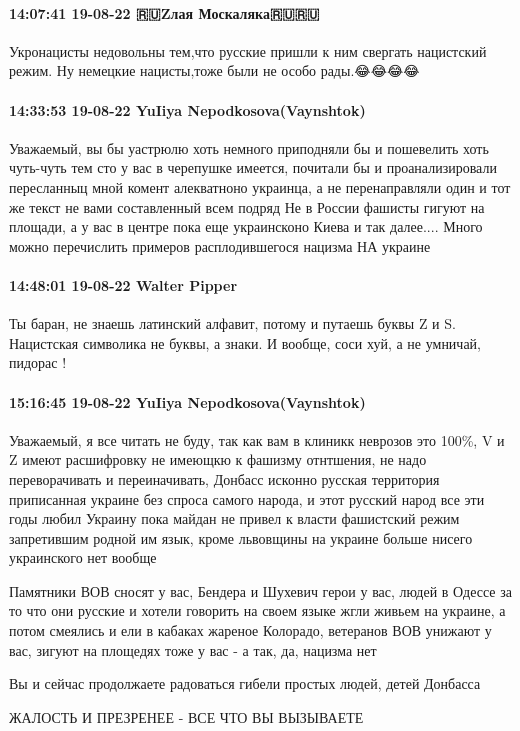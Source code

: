 \paragraph{14:07:41 19-08-22 🇷🇺Zлая Москаляка🇷🇺🇷🇺}

Укронацисты недовольны тем,что русские пришли к ним свергать нацистский режим.
Ну немецкие нацисты,тоже были не особо рады.😂😂😂😂

\paragraph{14:33:53 19-08-22 YuIiya Nepodkosova(Vaynshtok)}

Уважаемый, вы бы уастрюлю хоть немного приподняли бы и пошевелить хоть чуть-чуть тем сто у вас в черепушке имеется, почитали бы и проанализировали пересланныц мной комент алекватноно украинца, а не перенаправляли один и тот же текст не вами составленный всем подряд
Не в России фашисты гигуют на площади, а у вас в центре пока еще украинсконо Киева и так далее.... Много можно перечислить примеров расплодившегося нацизма НА украине

\paragraph{14:48:01 19-08-22 Walter Pipper}

Ты баран, не знаешь латинский алфавит, потому и путаешь буквы Z и S. Нацистская
символика не буквы, а знаки. И вообще, соси хуй, а не умничай, пидорас !

\paragraph{15:16:45 19-08-22 YuIiya Nepodkosova(Vaynshtok)}

Уважаемый, я все читать не буду, так как вам в клиникк неврозов это 100\%, V и Z
имеют расшифровку не имеющкю к фашизму отнтшения, не надо переворачивать и
переиначивать, Донбасс исконно русская территория приписанная украине без
спроса самого народа, и этот русский народ все эти годы любил Украину пока
майдан не привел к власти фашистский режим запретившим родной им язык, кроме
львовщины на украине больше нисего украинского нет вообще

Памятники ВОВ сносят у вас, Бендера и Шухевич герои у вас, людей в Одессе за то
что они русские и хотели говорить на своем языке жгли живьем на украине, а
потом смеялись и ели в кабаках жареное Колорадо, ветеранов ВОВ унижают у вас,
зигуют на площедях тоже у вас - а так, да, нацизма нет

Вы и сейчас продолжаете радоваться гибели простых людей, детей Донбасса

ЖАЛОСТЬ И ПРЕЗРЕНЕЕ - ВСЕ ЧТО ВЫ ВЫЗЫВАЕТЕ
